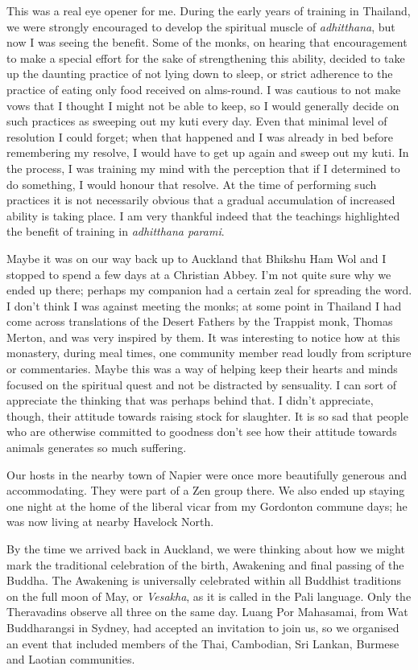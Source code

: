 This was a real eye opener for me. During the early years of training in
Thailand, we were strongly encouraged to develop the spiritual muscle of
\emph{adhitthana}, but now I was seeing the benefit. Some of the monks,
on hearing that encouragement to make a special effort for the sake of
strengthening this ability, decided to take up the daunting practice of
not lying down to sleep, or strict adherence to the practice of eating
only food received on alms-round. I was cautious to not make vows that I
thought I might not be able to keep, so I would generally decide on such
practices as sweeping out my kuti every day. Even that minimal level of
resolution I could forget; when that happened and I was already in bed
before remembering my resolve, I would have to get up again and sweep
out my kuti. In the process, I was training my mind with the perception
that if I determined to do something, I would honour that resolve. At
the time of performing such practices it is not necessarily obvious that
a gradual accumulation of increased ability is taking place. I am very
thankful indeed that the teachings highlighted the benefit of training
in \emph{adhitthana parami}.

Maybe it was on our way back up to Auckland that Bhikshu Ham Wol and I
stopped to spend a few days at a Christian Abbey. I'm not quite sure why
we ended up there; perhaps my companion had a certain zeal for spreading
the word. I don't think I was against meeting the monks; at some point
in Thailand I had come across translations of the Desert Fathers\cite{desert}
by the Trappist monk, Thomas Merton, and was very
inspired by them. It was interesting to notice how at this monastery,
during meal times, one community member read loudly from scripture or
commentaries. Maybe this was a way of helping keep their hearts and
minds focused on the spiritual quest and not be distracted by
sensuality. I can sort of appreciate the thinking that was perhaps
behind that. I didn't appreciate, though, their attitude towards raising
stock for slaughter.
It is so sad that people who are otherwise committed to goodness don't see how
their attitude towards animals generates so much suffering.

Our hosts in the nearby town of Napier were once more beautifully
generous and accommodating. They were part of a Zen group there. We also
ended up staying one night at the home of the liberal vicar from my
Gordonton commune days; he was now living at nearby Havelock North.

By the time we arrived back in Auckland, we were thinking about how we
might mark the traditional celebration of the birth, Awakening and final
passing of the Buddha. The Awakening is universally celebrated within
all Buddhist traditions on the full moon of May, or \emph{Vesakha}, as
it is called in the Pali language. Only the Theravadins observe all
three on the same day. Luang Por Mahasamai, from Wat Buddharangsi in
Sydney, had accepted an invitation to join us, so we organised an event
that included members of the Thai, Cambodian, Sri Lankan, Burmese and
Laotian communities.

